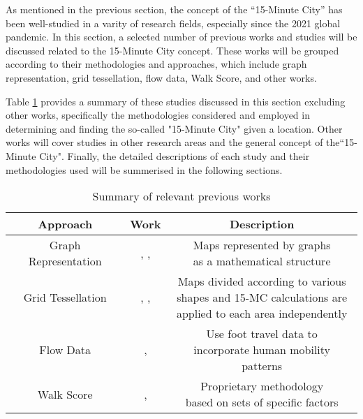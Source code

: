 As mentioned in the previous section, the concept of the ``15-Minute City'' has been well-studied in a varity of research fields, especially since the 2021 global pandemic. In this section, a selected number of previous works and studies will be discussed related to the 15-Minute City concept. These works will be grouped according to their methodologies and approaches, which include graph representation, grid tessellation, flow data, Walk Score, and other works.

Table \ref{tab:previous_works} provides a summary of these studies discussed in this section excluding other works, specifically the methodologies considered and employed in determining and finding the so-called "15-Minute City" given a location. Other works will cover studies in other research areas and the general concept of the``15-Minute City". Finally, the detailed descriptions of each study and their methodologies used will be summerised in the following sections.

\begin{table}[htbp]
    \begin{center}
        \caption{Summary of relevant previous works}
        \label{tab:previous_works}
        \begin{tabular}{ ccc }
            \hline
            \textbf{Approach} & \textbf{Work} & \textbf{Description} \\
            \hline
            \hline
            Graph Representation & \makecell{\cite{barbieri_graph_2023}, \cite{caselli_exploring_2022},\\\cite{rhoads_inclusive_2023}} & \makecell{Maps represented by graphs\\as a mathematical structure}\\
            \hline
            Grid Tessellation & \makecell{\cite{gaglione_urban_2022}, \cite{olivari_are_2023},\\\cite{Pezzica_Altafini_Mara_Chioni_2024}} & \makecell{Maps divided according to various\\shapes and 15-MC calculations are\\applied to each area independently} \\
            \hline
            Flow Data & \cite{zhang_towards_2023}, \cite{sarkar_measuring_2020} & \makecell{Use foot travel data to\\incorporate human mobility patterns} \\
            \hline
            Walk Score & \cite{walkscore}, \cite{weng_15-minute_2019} & \makecell{Proprietary methodology\\based on sets of specific factors} \\
            \hline
        \end{tabular}
    \end{center}
\end{table}

